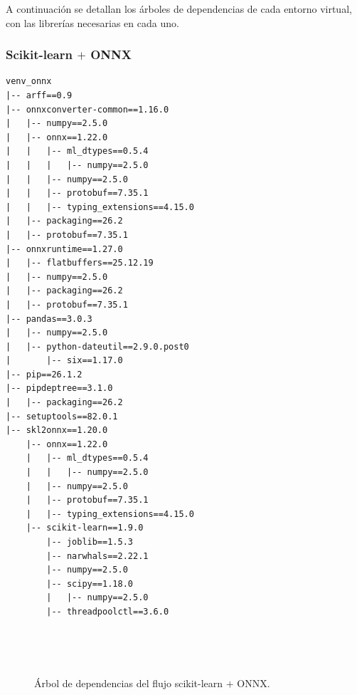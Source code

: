 \documentclass[a4paper,12pt,twoside,final]{book}
\begin{document}
A continuación se detallan los árboles de dependencias de cada entorno virtual, con las librerías necesarias en cada uno.

\subsubsection{Scikit-learn $+$ ONNX}
\begin{verbatim}
venv_onnx
|-- arff==0.9
|-- onnxconverter-common==1.16.0
|   |-- numpy==2.5.0
|   |-- onnx==1.22.0
|   |   |-- ml_dtypes==0.5.4
|   |   |   |-- numpy==2.5.0
|   |   |-- numpy==2.5.0
|   |   |-- protobuf==7.35.1
|   |   |-- typing_extensions==4.15.0
|   |-- packaging==26.2
|   |-- protobuf==7.35.1
|-- onnxruntime==1.27.0
|   |-- flatbuffers==25.12.19
|   |-- numpy==2.5.0
|   |-- packaging==26.2
|   |-- protobuf==7.35.1
|-- pandas==3.0.3
|   |-- numpy==2.5.0
|   |-- python-dateutil==2.9.0.post0
|       |-- six==1.17.0
|-- pip==26.1.2
|-- pipdeptree==3.1.0
|   |-- packaging==26.2
|-- setuptools==82.0.1
|-- skl2onnx==1.20.0
    |-- onnx==1.22.0
    |   |-- ml_dtypes==0.5.4
    |   |   |-- numpy==2.5.0
    |   |-- numpy==2.5.0
    |   |-- protobuf==7.35.1
    |   |-- typing_extensions==4.15.0
    |-- scikit-learn==1.9.0
        |-- joblib==1.5.3
        |-- narwhals==2.22.1
        |-- numpy==2.5.0
        |-- scipy==1.18.0
        |   |-- numpy==2.5.0
        |-- threadpoolctl==3.6.0
\end{verbatim}
\vspace{-2em}
\begin{figure}[ht]
  \centering
  \caption{Árbol de dependencias del flujo scikit-learn $+$ ONNX.}
  \label{fig:dependencias_onnx}
\end{figure}
\end{document}
